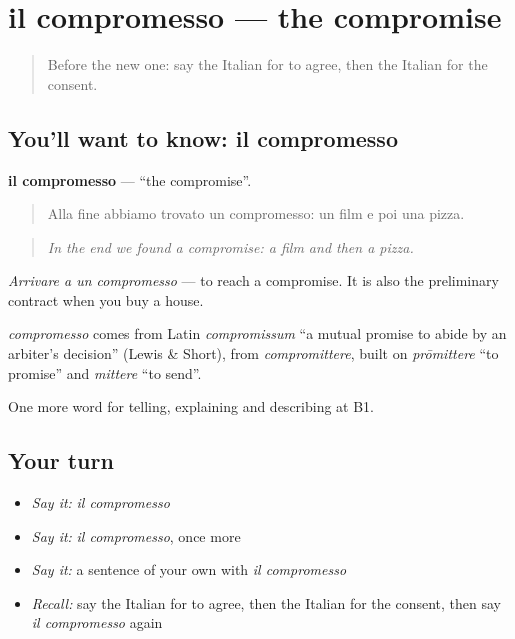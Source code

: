 \section[il compromesso]{il compromesso — the compromise}

\label{lesson:IT-C342-compromesso}



\begin{quote}
Before the new one: say the Italian for to agree, then the Italian for the consent.
\end{quote}

\subsection*{You'll want to know: il compromesso}
\textbf{il compromesso} — \textquotedblleft{}the compromise\textquotedblright{}.

\begin{quote}
Alla fine abbiamo trovato un compromesso: un film e poi una pizza.
\end{quote}

\begin{quote}
\emph{In the end we found a compromise: a film and then a pizza.}
\end{quote}

\emph{Arrivare a un compromesso} — to reach a compromise. It is also the preliminary contract when you buy a house.

\begin{cousinweb}
\emph{compromesso} comes from Latin \emph{compromissum} \textquotedblleft{}a mutual promise to abide by an arbiter's decision\textquotedblright{} (Lewis \& Short), from \emph{compromittere}, built on \emph{prōmittere} \textquotedblleft{}to promise\textquotedblright{} and \emph{mittere} \textquotedblleft{}to send\textquotedblright{}.
\end{cousinweb}

\begin{grammarlens}[title={What you've built}]
One more word for telling, explaining and describing at B1.
\end{grammarlens}

\subsection*{Your turn}
\begin{itemize}
\raggedright
  \item \emph{Say it:} \emph{il compromesso}
  \item \emph{Say it:} \emph{il compromesso}, once more
  \item \emph{Say it:} a sentence of your own with \emph{il compromesso}
  \item \emph{Recall:} say the Italian for to agree, then the Italian for the consent, then say \emph{il compromesso} again
\end{itemize}

